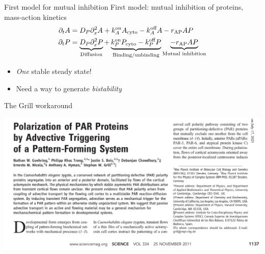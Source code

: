 \documentclass{beamer}
\newcommand{\6}[1]{#1_{\text{6}}}
\newcommand{\3}[1]{#1_{\text{3}}}
\begin{document}
\begin{frame}{First model for mutual inhibition}
First model: mutual inhibition of proteins, mass-action kinetics
\begin{align*}
\partial_t A &= D_P \partial_x^2 A + k^\text{on}_A A_\text{cyto} - k^\text{off}_A A -r_\text{AP} AP \\
\partial_t P &= \underbrace{D_P \partial_x^2 P}_\text{Diffusion} + \underbrace{k^\text{on}_P P_\text{cyto} - k^\text{off}_P P}_\text{Binding/unbinding} \underbrace{-r_\text{AP} AP}_\text{Mutual inhibition}
\end{align*}
\begin{itemize}
\item \emph{One} stable steady state!
\item Need a way to generate \emph{bistability}
\end{itemize}
\end{frame}

\begin{frame}{The Grill workaround}
\begin{center}
 \includegraphics[width=\textwidth]{GrillTitle.png}
\end{center}
\end{frame}
\end{document}
